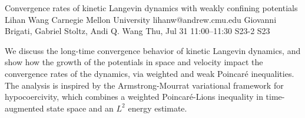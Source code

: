\begin{talk}
  {Convergence rates of kinetic Langevin dynamics with weakly confining potentials}%
  {Lihan Wang}%
  {Carnegie Mellon University}%
  {lihanw@andrew.cmu.edu}%
  {Giovanni Brigati, Gabriel Stoltz, Andi Q. Wang}%
  {}%
  {Thu, Jul 31 11:00–11:30}%
  {S23-2}%
  {S23}%
  
				
			
We discuss the long-time convergence behavior of kinetic Langevin dynamics, and show how the growth of the potentials in space and velocity impact the convergence rates of the dynamics, via weighted and weak Poincar\'e inequalities. The analysis is inspired by the Armstrong-Mourrat variational framework for hypocoercivity, which combines a weighted Poincaré-Lions inequality in time-augmented state space and an $L^2$ energy estimate.


\end{talk}

